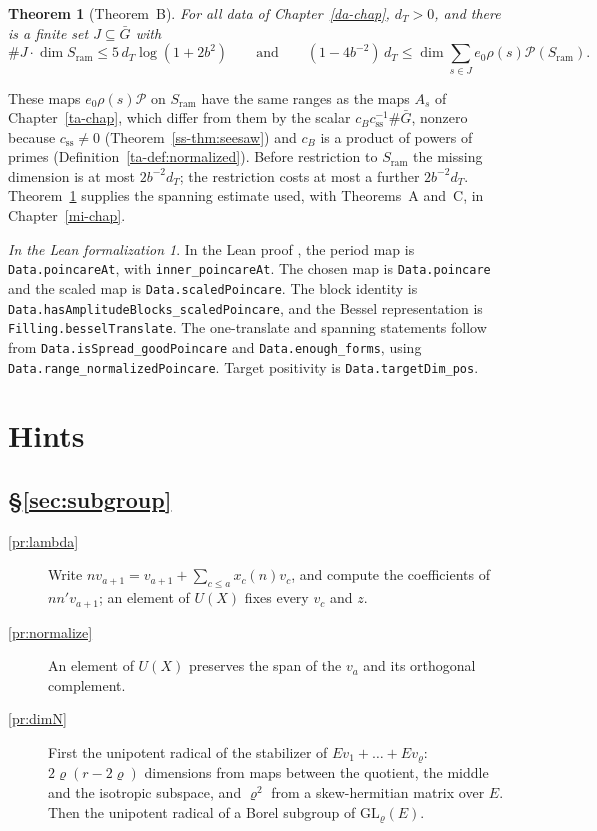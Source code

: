 \documentclass[reqno]{amsart}
\newcounter{chap}
\theoremstyle{definition}
\theoremstyle{plain}
\newtheorem{theorem}{Theorem}[section]
\theoremstyle{remark}
\newtheorem*{leanremark}{In the Lean formalization}
\newcommand{\Pc}{\mathcal P}
\newcommand{\Gb}{\bar G}
\newcommand{\Sr}{S_{\mathrm{ram}}}
\newcommand{\tl}[1]{\texttt{#1}}
\begin{document}
\begin{theorem}[Theorem~B]\label{thm:B}
For all data of Chapter~\ref{da-chap}, \(d_T>0\), and there is a finite set \(J\subseteq\Gb\) with
\[
 \#J\cdot\dim\Sr\le5\,d_T\log(1+2b^2)\qquad\text{and}\qquad(1-4b^{-2})\,d_T\le\dim\sum_{s\in J}e_0\rho(s)\Pc(\Sr).
\]
\end{theorem}

These maps \(e_0\rho(s)\Pc\) on \(\Sr\) have the same ranges as the maps \(A_s\) of Chapter~\ref{ta-chap}, which differ from them by the scalar \(c_Bc_{\mathrm{ss}}^{-1}\#\Gb\), nonzero because \(c_{\mathrm{ss}}\ne0\) (Theorem~\ref{ss-thm:seesaw}) and \(c_B\) is a product of powers of primes (Definition~\ref{ta-def:normalized}).  Before restriction to \(\Sr\) the missing dimension is at most \(2b^{-2}d_T\); the restriction costs at most a further \(2b^{-2}d_T\).  Theorem~\ref{thm:B} supplies the spanning estimate used, with Theorems~A and~C, in Chapter~\ref{mi-chap}.

\begin{leanremark}
\raggedright In the Lean proof \cite{GL}, the period map is \tl{Data.poincareAt}, with \tl{inner\_poincareAt}.  The chosen map is \tl{Data.poincare} and the scaled map is \tl{Data.scaledPoincare}.  The block identity is \tl{Data.hasAmplitudeBlocks\_scaledPoincare}, and the Bessel representation is \tl{Filling.besselTranslate}.  The one-translate and spanning statements follow from \tl{Data.isSpread\_goodPoincare} and \tl{Data.enough\_forms}, using \tl{Data.range\_normalizedPoincare}.  Target positivity is \tl{Data.targetDim\_pos}.
\end{leanremark}

\section*{Hints}

\subsection*{\S\ref{sec:subgroup}}
\begin{description}
\item[\ref{pr:lambda}] Write \(nv_{a+1}=v_{a+1}+\sum_{c\le a}x_c(n)v_c\), and compute the coefficients of \(nn'v_{a+1}\); an element of \(U(X)\) fixes every \(v_c\) and \(z\).
\item[\ref{pr:normalize}] An element of \(U(X)\) preserves the span of the \(v_a\) and its orthogonal complement.
\item[\ref{pr:dimN}] First the unipotent radical of the stabilizer of \(Ev_1+\dots+Ev_\varrho\): \(2\varrho(r-2\varrho)\) dimensions from maps between the quotient, the middle and the isotropic subspace, and \(\varrho^2\) from a skew-hermitian matrix over \(E\).  Then the unipotent radical of a Borel subgroup of \(\mathrm{GL}_\varrho(E)\).
\end{description}
\end{document}
